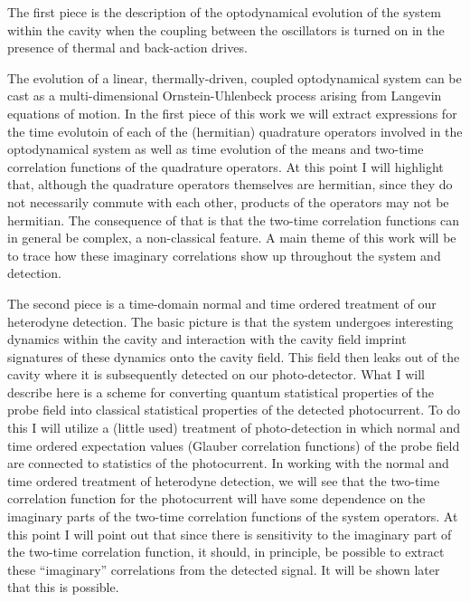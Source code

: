\documentclass[12pt]{article}
\begin{document}
The first piece is the description of the optodynamical evolution of the system within the cavity when the coupling between the oscillators is turned on in the presence of thermal and back-action drives. 

The evolution of a linear, thermally-driven, coupled optodynamical system can be cast as a multi-dimensional Ornstein-Uhlenbeck process arising from Langevin equations of motion. In the first piece of this work we will extract expressions for the time evolutoin of each of the (hermitian) quadrature operators involved in the optodynamical system as well as time evolution of the means and two-time correlation functions of the quadrature operators. At this point I will highlight that, although the quadrature operators themselves are hermitian, since they do not necessarily commute with each other, products of the operators may not be hermitian. The consequence of that is that the two-time correlation functions can in general be complex, a non-classical feature. A main theme of this work will be to trace how these imaginary correlations show up throughout the system and detection.


The second piece is a time-domain normal and time ordered treatment of our heterodyne detection. The basic picture is that the system undergoes interesting dynamics within the cavity and interaction with the cavity field imprint signatures of these dynamics onto the cavity field. This field then leaks out of the cavity where it is subsequently detected on our photo-detector. What I will describe here is a scheme for converting quantum statistical properties of the probe field into classical statistical properties of the detected photocurrent. To do this I will utilize a (little used) treatment of photo-detection in which normal and time ordered expectation values (Glauber correlation functions) of the probe field are connected to statistics of the photocurrent. In working with the normal and time ordered treatment of heterodyne detection, we will see that the two-time correlation function for the photocurrent will have some dependence on the imaginary parts of the two-time correlation functions of the system operators. At this point I will point out that since there is sensitivity to the imaginary part of the two-time correlation function, it should, in principle, be possible to extract these ``imaginary'' correlations from the detected signal. It will be shown later that this is possible.
\end{document}
